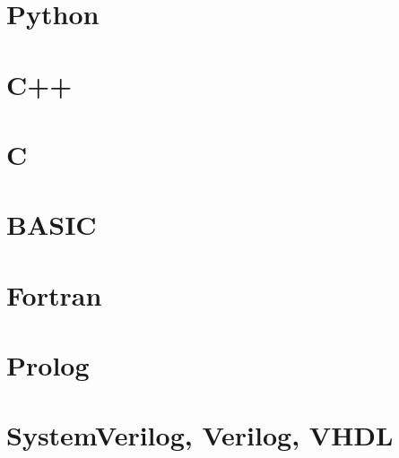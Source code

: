 \documentclass[letterpaper,12pt]{book}
\begin{document}
    \section{Python}

    \section{C++}

    \section{C}

    \section{BASIC}

    \section{Fortran}

    \section{Prolog}

    \section{SystemVerilog, Verilog, VHDL}
    \label{app:installations:HDL}
\end{document}
